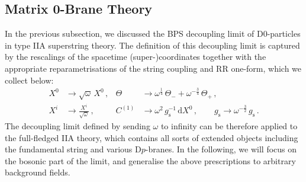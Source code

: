\documentclass[11pt]{article}
\newcommand{\dd}{\mathrm{d}}
\begin{document}
\subsection{Matrix 0-Brane Theory} \label{sec:mzbt}

In the previous subsection, we discussed the BPS decoupling limit of D0-particles in type IIA superstring theory. The definition of this decoupling limit is captured by the rescalings of the spacetime (super-)coordinates together with the appropriate reparametrisations of the string coupling and RR one-form, which we collect below:
%
\begin{subequations} \label{eq:rpmzt}
\begin{align}
    X^0 & \rightarrow \sqrt{\omega} \, X^0\,, 
        &%
    \Theta & \rightarrow \omega^\frac{1}{4} \, \Theta^{}_- + \omega^{-\frac{3}{4}} \, \Theta^{}_+\,, \\[4pt]
    X^i & \rightarrow \frac{X^i}{\sqrt{\omega}}\,,
        &%
    C^{(1)} & \rightarrow \omega^2 \, g^{-1}_\text{s} \, \dd X^0\,,
        \qquad%
    g^{}_\text{s} \rightarrow \omega^{-\frac{3}{2}} \, g^{}_\text{s}\,.
\end{align}
\end{subequations}
%
The decoupling limit defined by sending $\omega$ to infinity can be therefore applied to the full-fledged IIA theory, which contains all sorts of extended objects including the fundamental string and various D$p$-branes. In the following, we will focus on the bosonic part of the limit, and generalise the above prescriptions to arbitrary background fields. 
\end{document}
